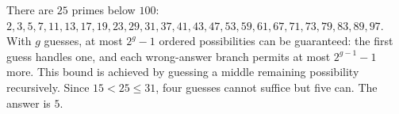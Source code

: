 There are $25$ primes below $100$: $2,3,5,7,11,13,17,19,23,29,31,37,41,43,47,53,59,61,67,71,73,79,83,89,97$. With $g$ guesses, at most $2^g-1$ ordered possibilities can be guaranteed: the first guess handles one, and each wrong-answer branch permits at most $2^{g-1}-1$ more. This bound is achieved by guessing a middle remaining possibility recursively. Since $15<25\le31$, four guesses cannot suffice but five can. The answer is $\boxed5$.
